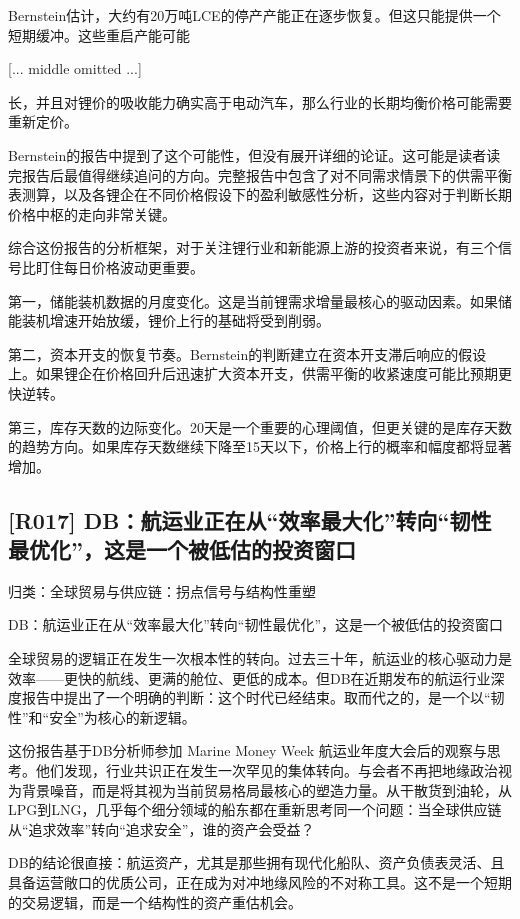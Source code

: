\documentclass[11pt]{ctexart}
\begin{document}
Bernstein估计，大约有20万吨LCE的停产产能正在逐步恢复。但这只能提供一个短期缓冲。这些重启产能可能

[... middle omitted ...]

长，并且对锂价的吸收能力确实高于电动汽车，那么行业的长期均衡价格可能需要重新定价。

Bernstein的报告中提到了这个可能性，但没有展开详细的论证。这可能是读者读完报告后最值得继续追问的方向。完整报告中包含了对不同需求情景下的供需平衡表测算，以及各锂企在不同价格假设下的盈利敏感性分析，这些内容对于判断长期价格中枢的走向非常关键。

综合这份报告的分析框架，对于关注锂行业和新能源上游的投资者来说，有三个信号比盯住每日价格波动更重要。

第一，储能装机数据的月度变化。这是当前锂需求增量最核心的驱动因素。如果储能装机增速开始放缓，锂价上行的基础将受到削弱。

第二，资本开支的恢复节奏。Bernstein的判断建立在资本开支滞后响应的假设上。如果锂企在价格回升后迅速扩大资本开支，供需平衡的收紧速度可能比预期更快逆转。

第三，库存天数的边际变化。20天是一个重要的心理阈值，但更关键的是库存天数的趋势方向。如果库存天数继续下降至15天以下，价格上行的概率和幅度都将显著增加。

\subsection{[R017] DB：航运业正在从“效率最大化”转向“韧性最优化”，这是一个被低估的投资窗口}
{\small\color{refgray}归类：全球贸易与供应链：拐点信号与结构性重塑}

DB：航运业正在从“效率最大化”转向“韧性最优化”，这是一个被低估的投资窗口

全球贸易的逻辑正在发生一次根本性的转向。过去三十年，航运业的核心驱动力是效率——更快的航线、更满的舱位、更低的成本。但DB在近期发布的航运行业深度报告中提出了一个明确的判断：这个时代已经结束。取而代之的，是一个以“韧性”和“安全”为核心的新逻辑。

这份报告基于DB分析师参加 Marine Money Week 航运业年度大会后的观察与思考。他们发现，行业共识正在发生一次罕见的集体转向。与会者不再把地缘政治视为背景噪音，而是将其视为当前贸易格局最核心的塑造力量。从干散货到油轮，从LPG到LNG，几乎每个细分领域的船东都在重新思考同一个问题：当全球供应链从“追求效率”转向“追求安全”，谁的资产会受益？

DB的结论很直接：航运资产，尤其是那些拥有现代化船队、资产负债表灵活、且具备运营敞口的优质公司，正在成为对冲地缘风险的不对称工具。这不是一个短期的交易逻辑，而是一个结构性的资产重估机会。
\end{document}
